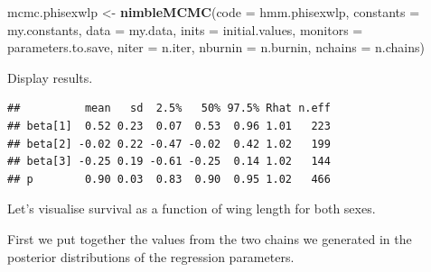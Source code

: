 \documentclass[
  12pt,
]{krantz}
\newenvironment{Shaded}{\begin{snugshade}}{\end{snugshade}}
\newcommand{\AttributeTok}[1]{\textcolor[rgb]{0.13,0.29,0.53}{#1}}
\newcommand{\FunctionTok}[1]{\textcolor[rgb]{0.13,0.29,0.53}{\textbf{#1}}}
\newcommand{\NormalTok}[1]{#1}
\newcommand{\OtherTok}[1]{\textcolor[rgb]{0.56,0.35,0.01}{#1}}
\newcommand{\SpecialCharTok}[1]{\textcolor[rgb]{0.81,0.36,0.00}{\textbf{#1}}}
\newcommand{\StringTok}[1]{\textcolor[rgb]{0.31,0.60,0.02}{#1}}
\begin{document}
\begin{Shaded}
\begin{Highlighting}[]
\NormalTok{mcmc.phisexwlp }\OtherTok{\textless{}{-}} \FunctionTok{nimbleMCMC}\NormalTok{(}\AttributeTok{code =}\NormalTok{ hmm.phisexwlp, }
                             \AttributeTok{constants =}\NormalTok{ my.constants,}
                             \AttributeTok{data =}\NormalTok{ my.data,              }
                             \AttributeTok{inits =}\NormalTok{ initial.values,}
                             \AttributeTok{monitors =}\NormalTok{ parameters.to.save,}
                             \AttributeTok{niter =}\NormalTok{ n.iter,}
                             \AttributeTok{nburnin =}\NormalTok{ n.burnin, }
                             \AttributeTok{nchains =}\NormalTok{ n.chains)}
\end{Highlighting}
\end{Shaded}

Display results.

\begin{verbatim}
##          mean   sd  2.5%   50% 97.5% Rhat n.eff
## beta[1]  0.52 0.23  0.07  0.53  0.96 1.01   223
## beta[2] -0.02 0.22 -0.47 -0.02  0.42 1.02   199
## beta[3] -0.25 0.19 -0.61 -0.25  0.14 1.02   144
## p        0.90 0.03  0.83  0.90  0.95 1.02   466
\end{verbatim}

Let's visualise survival as a function of wing length for both sexes.

First we put together the values from the two chains we generated in the posterior distributions of the regression parameters.

\begin{Shaded}
\end{Shaded}
\end{document}
